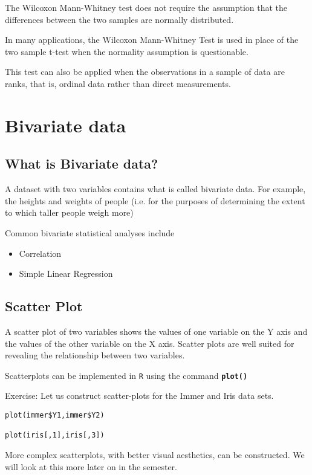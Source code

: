 The Wilcoxon Mann-Whitney test does not require the assumption that the differences between the two samples are normally distributed.

In many applications, the Wilcoxon Mann-Whitney Test is used in place of the two sample t-test when the normality assumption is questionable.

This test can also be applied when the observations in a sample of data are ranks, that is, ordinal data rather than direct measurements.

\newpage
\section{Bivariate data}
\subsection{What is Bivariate data?}

A dataset with two variables contains what is called bivariate data. For example, the heights and weights of people (i.e. for the purposes of determining the extent to which taller people weigh more)

Common bivariate statistical analyses include
\begin{itemize}
\item Correlation
\item Simple Linear Regression
\end{itemize}

\subsection{Scatter Plot} A scatter plot of two variables shows the values of one variable on the Y axis and the values of the other variable on the X axis. Scatter plots are well suited for revealing the relationship between two variables.

Scatterplots can be implemented in \texttt{R} using the command \texttt{\textbf{plot()}}

Exercise: Let us construct scatter-plots for the Immer and Iris data sets.

\begin{framed}
\begin{verbatim}
plot(immer$Y1,immer$Y2)

plot(iris[,1],iris[,3])
\end{verbatim}
\end{framed}
More complex scatterplots, with better visual aesthetics, can be constructed. We will look at this more later on in the semester.

